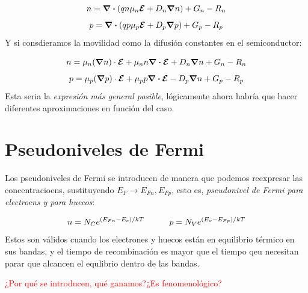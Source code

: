 \begin{equation}
	n =\div \left( qn\mu_n \boldsymbol{\mathcal{E}} +  D_n \grad n   \right) + G_n - R_n
\end{equation}
\begin{equation}
	p = \div \left( qp\mu_p \boldsymbol{\mathcal{E}} +  D_p \grad p   \right) + G_p - R_p
\end{equation}
Y si consdieramos la movilidad como la difusión constantes en el semiconductor:

\begin{equation}
	n = \mu_n (\grad n) \cdot \boldsymbol{\mathcal{E}} + \mu_n n \div \boldsymbol{\mathcal{E}} + D_n \grad n + G_n - R_n
\end{equation}
\begin{equation}
	p = \mu_p (\grad p) \cdot \boldsymbol{\mathcal{E}} + \mu_p p \div \boldsymbol{\mathcal{E}} - D_p \grad n + G_p - R_p
\end{equation}
Esta seria la \textit{expresión más general posible}, lógicamente ahora habría que hacer diferentes aproximaciones en función del caso.





\section{Pseudoniveles de Fermi}

Los pseudoniveles de Fermi se introducen de manera que podemos reexpresar las concentracioens, sustituyendo $E_F\rightarrow E_{Fn},E_{Fp}$, esto es, \textit{pseudonivel de Fermi para electroens y para huecos}:

\begin{equation}
	n=N_C e^{(E_{Fn}-E_c)/kT} \quad \quad \quad 
	p=N_V e^{(E_{v}-E_{Fp})/kT}
\end{equation}
Estos son válidos cuando los electrones y huecos están en equilibrio térmico en sus bandas, y el tiempo de recombinación es mayor que el tiempo qeu necesitan parar que alcancen el equlibrio dentro de las bandas.

\begin{Anotacion}
	\textcolor{red}{¿Por qué se introducen, qué ganamos?¿Es fenomenológico?}
\end{Anotacion}




